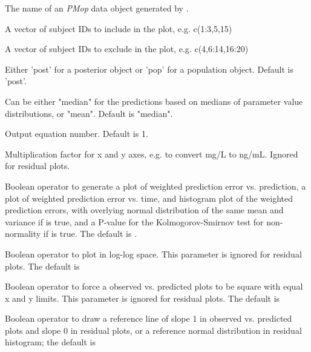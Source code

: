 \documentclass[a4paper]{book}
\begin{document}
%
\begin{Arguments}
\begin{ldescription}
\item[\code{x}] The name of an \emph{PMop} data object generated by .

\item[\code{include}] A vector of subject IDs to include in the plot, e.g. c(1:3,5,15)

\item[\code{exclude}] A vector of subject IDs to exclude in the plot, e.g. c(4,6:14,16:20)

\item[\code{pred.type}] Either 'post' for a posterior object or 'pop' for a population object.  Default is 'post'.

\item[\code{icen}] Can be either "median" for the predictions based on medians of  parameter value
distributions, or "mean".  Default is "median".

\item[\code{outeq}] Output equation number.  Default is 1.

\item[\code{mult}] Multiplication factor for x and y axes, e.g. to convert mg/L to ng/mL.  Ignored for residual plots.

\item[\code{resid}] Boolean operator to generate a plot of weighted prediction error vs. prediction,
a plot of weighted prediction error vs. time, and histogram plot of the weighted prediction errors,
with overlying normal distribution of the same mean and variance if  is true, and
a P-value for the Kolmogorov-Smirnov test for non-normality if  is true.  The default is .

\item[\code{log}] Boolean operator to plot in log-log space.  This parameter is ignored for residual plots.  The default is 

\item[\code{square}] Boolean operator to force a observed vs. predicted plots to be square with equal x and y limits.
This parameter is ignored for residual plots.  The default is 

\item[\code{ref}] Boolean operator to draw a reference line of slope 1 in observed vs. predicted plots and
slope 0 in residual plots, or a reference normal distribution in residual histogram; the default is 


\end{ldescription}
\end{Arguments}
\end{document}
